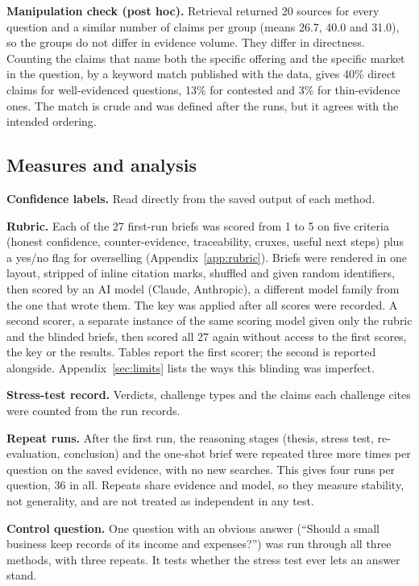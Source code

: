 \documentclass[11pt]{article}
\begin{document}
\textbf{Manipulation check (post hoc).} Retrieval returned 20 sources for every question and a similar number of claims per group (means 26.7, 40.0 and 31.0), so the groups do not differ in evidence volume. They differ in directness. Counting the claims that name both the specific offering and the specific market in the question, by a keyword match published with the data, gives 40\% direct claims for well-evidenced questions, 13\% for contested and 3\% for thin-evidence ones. The match is crude and was defined after the runs, but it agrees with the intended ordering.

\subsection{Measures and analysis}

\textbf{Confidence labels.} Read directly from the saved output of each method.

\textbf{Rubric.} Each of the 27 first-run briefs was scored from 1 to 5 on five criteria (honest confidence, counter-evidence, traceability, cruxes, useful next steps) plus a yes/no flag for overselling (Appendix~\ref{app:rubric}). Briefs were rendered in one layout, stripped of inline citation marks, shuffled and given random identifiers, then scored by an AI model (Claude, Anthropic), a different model family from the one that wrote them. The key was applied after all scores were recorded. A second scorer, a separate instance of the same scoring model given only the rubric and the blinded briefs, then scored all 27 again without access to the first scores, the key or the results. Tables report the first scorer; the second is reported alongside. Appendix~\ref{sec:limits} lists the ways this blinding was imperfect.

\textbf{Stress-test record.} Verdicts, challenge types and the claims each challenge cites were counted from the run records.

\textbf{Repeat runs.} After the first run, the reasoning stages (thesis, stress test, re-evaluation, conclusion) and the one-shot brief were repeated three more times per question on the saved evidence, with no new searches. This gives four runs per question, 36 in all. Repeats share evidence and model, so they measure stability, not generality, and are not treated as independent in any test.

\textbf{Control question.} One question with an obvious answer (``Should a small business keep records of its income and expenses?'') was run through all three methods, with three repeats. It tests whether the stress test ever lets an answer stand.
\end{document}
